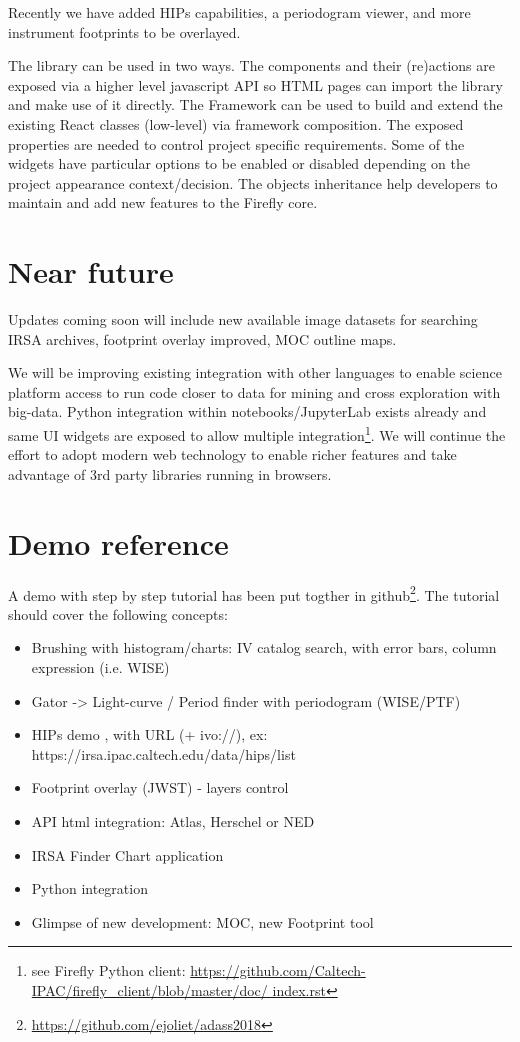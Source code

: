 \documentclass[11pt,twoside]{article}
\begin{document}
Recently we have added HIPs capabilities, a periodogram viewer, and more instrument footprints to be overlayed.

The library can be used in two ways. The components and their (re)actions are exposed via a higher level javascript API so HTML pages can import the library and make use of it directly.
The Framework can be used to build and extend the existing React classes (low-level) via framework composition. The exposed properties are needed to control project specific requirements. Some of the widgets have particular options to be enabled or disabled depending on the project appearance context/decision. The objects inheritance help developers to maintain and add new features to the Firefly core.


\section{Near future}

Updates coming soon will include new available image datasets for searching IRSA archives, footprint overlay improved, MOC outline maps.

We will be improving existing integration with other languages to enable science platform access to run code closer to data for mining and cross exploration with big-data.
Python integration within notebooks/JupyterLab exists already and same UI widgets are exposed to allow multiple integration\footnote{see Firefly Python client: \url{https://github.com/Caltech-IPAC/firefly_client/blob/master/doc/ index.rst}}.
We will continue the effort to adopt modern web technology to enable richer features and take advantage of 3rd party libraries running in browsers.



\section{Demo reference}

A demo with step by step tutorial has been put togther in github\footnote{\url{https://github.com/ejoliet/adass2018}}.
The tutorial should cover the following concepts:

\begin{itemize}
  \item Brushing with histogram/charts: IV catalog search, with error bars, column expression (i.e. WISE)
  \item Gator -> Light-curve / Period finder with periodogram (WISE/PTF)
  \item HIPs demo , with URL (+ ivo://), ex: https://irsa.ipac.caltech.edu/data/hips/list
  \item Footprint overlay (JWST) - layers control
  \item API html integration: Atlas, Herschel or NED
  \item IRSA Finder Chart application
  \item Python integration
  \item Glimpse of new development: MOC, new Footprint tool
\end{itemize}
\smallskip
\end{document}
